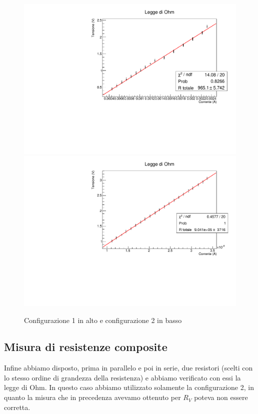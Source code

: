 \begin{figure}[H]
    \centering
    \includegraphics[scale=.45]{Immagini/fit3.pdf}
    \quad
    \includegraphics[scale=.45]{Immagini/fit4.pdf}
    \caption{Configurazione 1 in alto e configurazione 2 in basso}
\end{figure}


\subsection{Misura di resistenze composite}
Infine abbiamo disposto, prima in parallelo e poi in serie, due resistori (scelti con lo stesso ordine di grandezza della resistenza) e abbiamo verificato con essi la legge di Ohm. In questo caso abbiamo utilizzato solamente la configurazione 2, in quanto la misura che in precedenza avevamo ottenuto per $R_{V}$ poteva non essere corretta.

